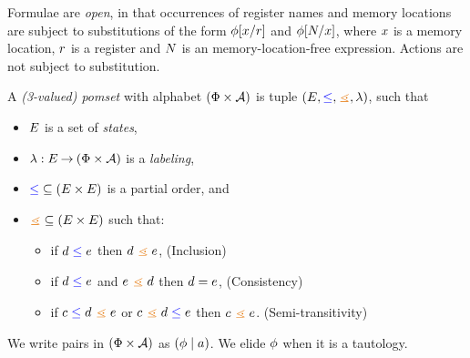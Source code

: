 Formulae are \emph{open}, in that occurrences of register names and memory
locations are subject to substitutions of the form $\phi[x/r]$ and
$\phi[N/x]$, where $x$ is a memory location, $r$ is a
register and $N$ is an memory-location-free expression.  Actions are not
subject to substitution.

\begin{definition}
  \label{def:3valued}
  A \emph{(3-valued) pomset} with alphabet $(\Phi\times\mathcal{A})$ is tuple $(\Event,
  {\le}, {\gtN}, \labeling)$, such that 
  \begin{itemize}
  \item $E$ is a set of \emph{states},
  \item $\lambda: E \mathbin\rightarrow (\Phi\times\mathcal{A})$ is a \emph{labeling},
  \item ${\mathrel{{\color{blue}\leq}}} \subseteq (E\times E)$ is a partial order, and
  \item ${\gtN} \subseteq (\Event\times\Event)$ such that:
    \begin{itemize}
    \item\label{5a} if $d \mathrel{{\color{blue}\leq}} e$ then $\bEv \gtN \aEv$, \hfill (Inclusion)
    \item\label{5b} if $d \mathrel{{\color{blue}\leq}} e$ and $\aEv \gtN \bEv$ then $d = e$,  \hfill (Consistency)
    \item\label{5c} if $\cEv \le \bEv \gtN \aEv$ or $\cEv \gtN \bEv \le \aEv$ then $\cEv \gtN \aEv$.  \hfill (Semi-transitivity)
    \end{itemize}
\end{itemize}
\end{definition}
We write pairs in $(\Phi\times\mathcal{A})$ as $(\phi \mid a)$.  We elide
$\phi$ when it is a tautology.



